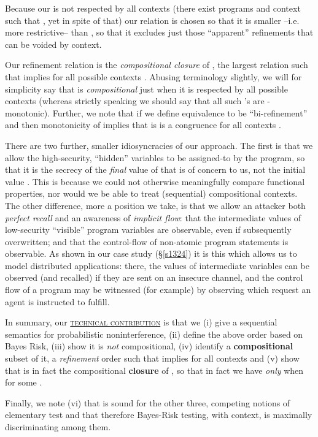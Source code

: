 \documentclass[runningheads]{llncs}
\newcommand\Sec[1] {Sec.~\ref{#1}}
\renewcommand\Sec[1] {\S\ref{#1}}
\begin{document}
Because our  is not respected by all contexts (there exist programs  and context  such that , yet  in spite of that) our relation  is chosen so that it is smaller --i.e. more restrictive-- than , so that it excludes just those ``apparent'' refinements that can be voided by context.

Our refinement relation is the \emph{compositional closure} of , the largest relation  such that  implies  for all possible contexts . Abusing terminology slightly, we will for simplicity say that  is \emph{compositional} just when it is respected by all possible contexts  (whereas strictly speaking we should say that all such 's are -monotonic). Further, we note that if we define equivalence  to be ``bi-refinement''  and  then monotonicity of  implies that  is is a congruence for all contexts .

There are two further, smaller idiosyncracies of our approach. The first is that we allow the high-security, ``hidden'' variables to be assigned-to by the program, so that it is the secrecy of the \emph{final} value  of  that is of concern to us, not the initial value . This is because we could not otherwise meaningfully compare functional properties, nor would we be able to treat (sequential) compositional contexts. The other difference, more a position we take, is that we allow an attacker both \emph{perfect recall} and an awareness of \emph{implicit flow}: that the intermediate values of low-security ``visible'' program variables are observable, even if subsequently overwritten; and that the control-flow of non-atomic program statements is observable. 
As shown in our case study (\Sec{s1324}) it is this which allows us to model distributed applications: there, the values of intermediate variables can be observed (and recalled) if they are sent on an insecure channel, and the control flow of a program may be witnessed (for example) by observing which 
request an agent is instructed to fulfill.

\smallskip
In summary, our \underline{\textsc{technical contribution}} is that we (i) give a sequential semantics for probabilistic noninterference, (ii) define the above order  based on Bayes Risk, (iii) show it is \emph{not} compositional, (iv) identify a \textbf{compositional} subset of it, a \emph{refinement} order  such that  implies  for all contexts  and (v) show that  is in fact the compositional \textbf{closure} of , so that in fact we have  \emph{only} when  for some .

Finally, we note (vi) that  is sound for the other three, competing notions of elementary test and that therefore Bayes-Risk testing, with context, is maximally discriminating among them.
\end{document}

